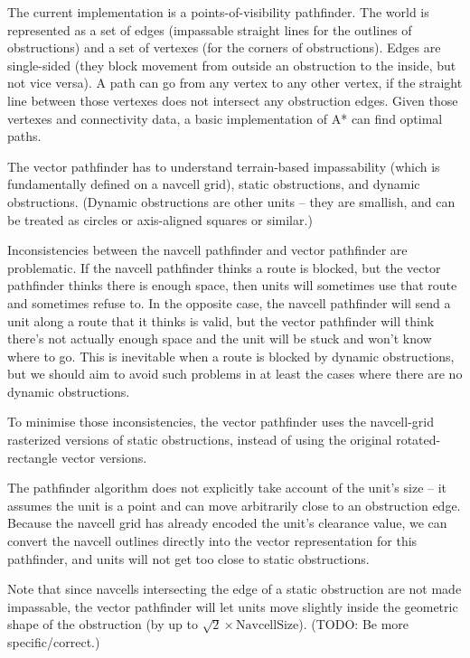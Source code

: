 \documentclass[a4paper,10pt]{article}
\begin{document}
The current implementation is a points-of-visibility pathfinder.
The world is represented as a set of edges (impassable straight lines for the outlines of obstructions)
and a set of vertexes (for the corners of obstructions).
Edges are single-sided (they block movement from outside an obstruction to the inside,
but not vice versa).
A path can go from any vertex to any other vertex, if the straight line between those vertexes
does not intersect any obstruction edges.
Given those vertexes and connectivity data,
a basic implementation of A* can find optimal paths.

The vector pathfinder has to understand terrain-based impassability
(which is fundamentally defined on a navcell grid),
static obstructions, and dynamic obstructions.
(Dynamic obstructions are other units -- they are smallish,
and can be treated as circles or axis-aligned squares or similar.)

Inconsistencies between the navcell pathfinder and vector pathfinder are problematic.
If the navcell pathfinder thinks a route is blocked,
but the vector pathfinder thinks there is enough space,
then units will sometimes use that route and sometimes refuse to.
In the opposite case, the navcell pathfinder will send a unit along a route
that it thinks is valid,
but the vector pathfinder will think there's not actually enough space
and the unit will be stuck and won't know where to go.
This is inevitable when a route is blocked by dynamic obstructions,
but we should aim to avoid such problems in at least the cases where there are
no dynamic obstructions.

To minimise those inconsistencies,
the vector pathfinder uses the navcell-grid rasterized versions of static obstructions,
instead of using the original rotated-rectangle vector versions.

The pathfinder algorithm does not explicitly take account of the unit's size --
it assumes the unit is a point and can move arbitrarily close to an obstruction edge.
Because the navcell grid has already encoded the unit's clearance value,
we can convert the navcell outlines directly into the vector representation
for this pathfinder, and units will not get too close to static obstructions.

Note that since navcells intersecting the edge of a static obstruction
are not made impassable,
the vector pathfinder will let units move slightly inside the
geometric shape of the obstruction
(by up to $\sqrt{2}\times\mathrm{NavcellSize}$).
(TODO: Be more specific/correct.)
\end{document}
